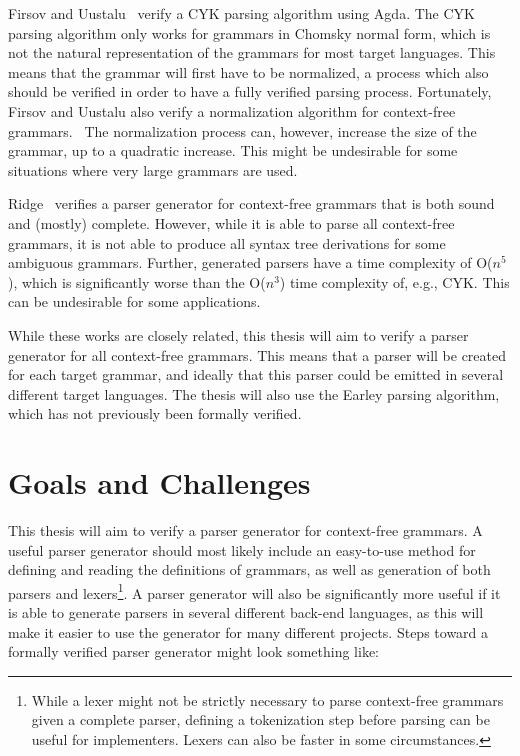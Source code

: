 \documentclass{article}
\begin{document}
	Firsov and Uustalu~\cite{Firsov14} verify a CYK parsing algorithm using
	Agda. The CYK parsing algorithm only works for grammars in Chomsky normal
	form, which is not the natural representation of the grammars for most
	target languages. This means that the grammar will first have to be
	normalized, a process which also should be verified in order to have a
	fully verified parsing process. Fortunately, Firsov and Uustalu also verify
	a normalization algorithm for context-free grammars.~\cite{Firsov15} The
	normalization process can, however, increase the size of the grammar, up to
	a quadratic increase. This might be undesirable for some situations where
	very large grammars are used.

	Ridge~\cite{ridge11} verifies a parser generator for context-free grammars
	that is both sound and (mostly) complete. However, while it is able to
	parse all context-free grammars, it is not able to produce all syntax tree
	derivations for some ambiguous grammars. Further, generated parsers have a
	time complexity of O($n^5$), which is significantly worse than the O($n^3$)
	time complexity of, e.g., CYK. This can be undesirable for some
	applications.

	While these works are closely related, this thesis will aim to verify a
	parser generator for all context-free grammars. This means that a parser
	will be created for each target grammar, and ideally that this parser could
	be emitted in several different target languages. The thesis will also use
	the Earley parsing algorithm, which has not previously been formally
	verified.

\section{Goals and Challenges}


	This thesis will aim to verify a parser generator for context-free
	grammars. A useful parser generator should most likely include an
	easy-to-use method for defining and reading the definitions of grammars, as
	well as generation of both parsers and lexers\footnote{While a lexer might
	not be strictly necessary to parse context-free grammars given a complete
	parser, defining a tokenization step before parsing can be useful for
	implementers.  Lexers can also be faster in some circumstances.}. A parser
	generator will also be significantly more useful if it is able to generate
	parsers in several different back-end languages, as this will make it
	easier to use the generator for many different projects.  Steps toward a
	formally verified parser generator might look something like:
\end{document}
